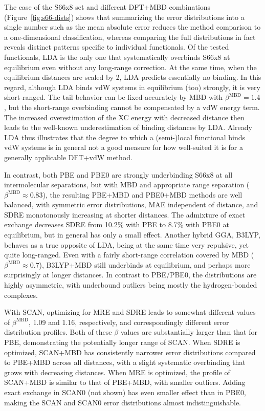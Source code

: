 The case of the S66x8 set and different DFT+MBD combinations (Figure~\ref{fig:s66-dists}) shows that summarizing the error distributions into a single number such as the mean absolute error reduces the method comparison to a one-dimensional classification, whereas comparing the full distributions in fact reveals distinct patterns specific to individual functionals.
Of the tested functionals, LDA is the only one that systematically overbinds S66x8 at equilibrium even without any long-range correction.
At the same time, when the equilibrium distances are scaled by 2, LDA predicts essentially no binding.
In this regard, although LDA binds vdW systems in equilibrium (too) strongly, it is very short-ranged.
The tail behavior can be fixed accurately by MBD with $\beta^\text{MBD}=1.4$, but the short-range overbinding cannot be compensated by a vdW energy term.
The increased overestimation of the XC energy with decreased distance then leads to the well-known underestimation of binding distances by LDA\@.
Already LDA thus illustrates that the degree to which a (semi-)local functional binds vdW systems is in general not a good measure for how well-suited it is for a generally applicable DFT+vdW method. %

In contrast, both PBE and PBE0 are strongly underbinding S66x8 at all intermolecular separations, but with MBD and appropriate range separation ($\beta^\text{MBD}\approx0.83$), the resulting PBE+MBD and PBE0+MBD methods are well balanced, with symmetric error distributions, MAE independent of distance, and SDRE monotonously increasing at shorter distances.
The admixture of exact exchange decreases SDRE from 10.2\% with PBE to 8.7\% with PBE0 at equilibrium, but in general has only a small effect.
Another hybrid GGA, B3LYP, behaves as a true opposite of LDA, being at the same time very repulsive, yet quite long-ranged.
Even with a fairly short-range correlation covered by MBD ($\beta^\text{MBD}\approx0.7$), B3LYP+MBD still underbinds at equilibrium, and perhaps more surprisingly at longer distances.
In contrast to PBE/PBE0, the distributions are highly asymmetric, with underbound outliers being mostly the hydrogen-bonded complexes.

With SCAN, optimizing for MRE and SDRE leads to somewhat different values of $\beta^\text{MBD}$, 1.09 and 1.16, respectively, and correspondingly different error distribution profiles.
Both of these $\beta$ values are substantially larger than that for PBE, demonstrating the potentially longer range of SCAN\@.
When SDRE is optimized, SCAN+MBD has consistently narrower error distributions compared to PBE+MBD across all distances, with a slight systematic overbinding that grows with decreasing distances.
When MRE is optimized, the profile of SCAN+MBD is similar to that of PBE+MBD, with smaller outliers.
Adding exact exchange in SCAN0 (not shown) has even smaller effect than in PBE0, making the SCAN and SCAN0 error distributions almost indistinguishable.

